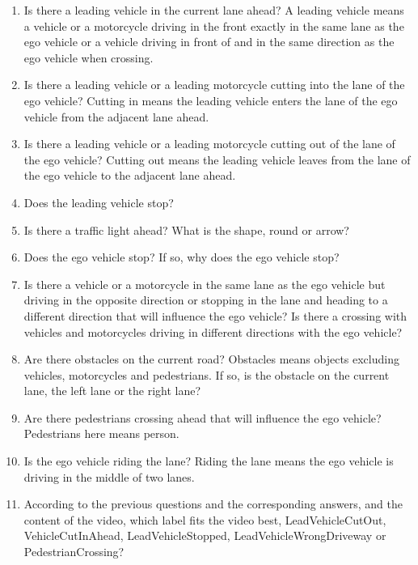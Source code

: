 \documentclass[lettersize,journal]{IEEEtran}
\begin{document}
\begin{enumerate}

    \item Is there a leading vehicle in the current lane ahead? A leading vehicle means a vehicle or a motorcycle driving in the front exactly in the same lane as the ego vehicle or a vehicle driving in front of and in the same direction as the ego vehicle when crossing.
    \item Is there a leading vehicle or a leading motorcycle cutting into the lane of the ego vehicle? Cutting in means the leading vehicle enters the lane of the ego vehicle from the adjacent lane ahead.
    \item Is there a leading vehicle or a leading motorcycle cutting out of the lane of the ego vehicle? Cutting out means the leading vehicle leaves from the lane of the ego vehicle to the adjacent lane ahead.
    \item Does the leading vehicle stop?
    \item Is there a traffic light ahead? What is the shape, round or arrow?
    \item Does the ego vehicle stop? If so, why does the ego vehicle stop?
    \item Is there a vehicle or a motorcycle in the same lane as the ego vehicle but driving in the opposite direction or stopping in the lane and heading to a different direction that will influence the ego vehicle? Is there a crossing with vehicles and motorcycles driving in different directions with the ego vehicle?
    \item Are there obstacles on the current road? Obstacles means objects excluding vehicles, motorcycles and pedestrians. If so, is the obstacle on the current lane, the left lane or the right lane?
    \item Are there pedestrians crossing ahead that will influence the ego vehicle? Pedestrians here means person.
    
    \item Is the ego vehicle riding the lane? Riding the lane means the ego vehicle is driving in the middle of two lanes.
    \item According to the previous questions and the corresponding answers, and the content of the video, which label fits the video best, LeadVehicleCutOut, VehicleCutInAhead, LeadVehicleStopped, LeadVehicleWrongDriveway or PedestrianCrossing?
\end{enumerate}
\end{document}
